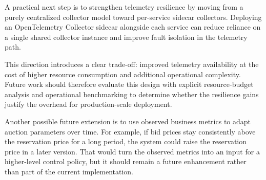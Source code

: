 A practical next step is to strengthen telemetry resilience by moving from a purely centralized collector model toward per-service sidecar collectors. Deploying an OpenTelemetry Collector sidecar alongside each service can reduce reliance on a single shared collector instance and improve fault isolation in the telemetry path.

This direction introduces a clear trade-off: improved telemetry availability at the cost of higher resource consumption and additional operational complexity. Future work should therefore evaluate this design with explicit resource-budget analysis and operational benchmarking to determine whether the resilience gains justify the overhead for production-scale deployment.

Another possible future extension is to use observed business metrics to adapt auction parameters over time. For example, if bid prices stay consistently above the reservation price for a long period, the system could raise the reservation price in a later version. That would turn the observed metrics into an input for a higher-level control policy, but it should remain a future enhancement rather than part of the current implementation.
